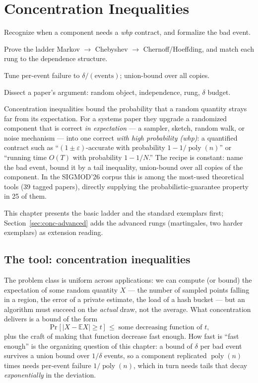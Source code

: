 \chapter{Concentration Inequalities}
\setcounter{section}{-1}   %
\label{ch:conc}

\begin{objectives}
\item Recognize when a component needs a \emph{whp} contract, and formalize the bad event.
\item Prove the ladder Markov $\to$ Chebyshev $\to$ Chernoff/Hoeffding, and match each rung
  to the dependence structure.
\item Tune per-event failure to $\delta/(\text{events})$; union-bound over all copies.
\item Dissect a paper's argument: random object, independence, rung, $\delta$ budget.
\end{objectives}

Concentration inequalities bound the probability that a random quantity strays far from
its expectation. For a systems paper they upgrade a randomized component that is correct
\emph{in expectation} --- a sampler, sketch, random walk, or noise mechanism --- into one
correct \emph{with high probability (whp)}: a quantified contract such as
``$(1\pm\varepsilon)$-accurate with probability $1-1/\operatorname{poly}(n)$'' or
``running time $O(T)$ with probability $1-1/N$.'' The recipe is constant: name the bad
event, bound it by a tail inequality, union-bound over all copies of the component. In the
SIGMOD'26 corpus this is among the most-used theoretical tools (39 tagged papers),
directly supplying the probabilistic-guarantee property in 25 of them.

This chapter presents the basic ladder and the standard exemplars first;
Section~\ref{sec:conc-advanced} adds the advanced rungs (martingales, two harder
exemplars) as extension reading.

\section{The tool: concentration inequalities}

The problem class is uniform across applications: we can compute (or bound) the
expectation of some random quantity $X$ --- the number of sampled points falling in a
region, the error of a private estimate, the load of a hash bucket --- but an algorithm
must succeed on the \emph{actual} draw, not the average. What concentration delivers is a
bound of the form
\[
\Pr\bigl[\,|X - \mathbb{E}X| \ge t\,\bigr] \;\le\; \text{some decreasing function of } t,
\]
plus the craft of making that function decrease fast enough. How fast is ``fast enough''
is the organizing question of this chapter: a bound of $\delta$ per bad event survives a
union bound over $1/\delta$ events, so a component replicated $\operatorname{poly}(n)$
times needs per-event failure $1/\operatorname{poly}(n)$, which in turn needs tails that
decay \emph{exponentially} in the deviation.

